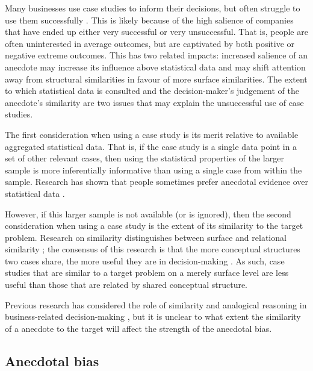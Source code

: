 \documentclass[a4paper, nobind, dvipsnames]{templates/ociamthesis}
\theoremstyle{definition}
\theoremstyle{definition}
\theoremstyle{definition}
\theoremstyle{definition}
\theoremstyle{remark}
\begin{document}
Many businesses use case studies to inform their decisions, but often struggle
to use them successfully \autocite{gavetti2005a}. This is likely because of the high
salience of companies that have ended up either very successful or very
unsuccessful. That is, people are often uninterested in average outcomes, but
are captivated by both positive or negative extreme outcomes. This has two
related impacts: increased salience of an anecdote may increase its influence
above statistical data and may shift attention away from structural similarities
in favour of more surface similarities. The extent to which statistical data is
consulted and the decision-maker's judgement of the anecdote's similarity are
two issues that may explain the unsuccessful use of case studies.

The first consideration when using a case study is its merit relative to
available aggregated statistical data. That is, if the case study is a single
data point in a set of other relevant cases, then using the statistical
properties of the larger sample is more inferentially informative than using a
single case from within the sample. Research has shown that people sometimes
prefer anecdotal evidence over statistical data \autocites[e.g.,][]{reinard1988,shen2015,jaramillo2019}.

However, if this larger sample is not available (or is ignored), then the second
consideration when using a case study is the extent of its similarity to the
target problem. Research on similarity distinguishes between surface and
relational similarity \autocite{gentner1983}; the consensus of this research is that the
more conceptual structures two cases share, the more useful they are in
decision-making \autocite{markman1995,lassaline1996}. As such, case studies that are
similar to a target problem on a merely surface level are less useful than those
that are related by shared conceptual structure.

Previous research has considered the role of similarity and analogical reasoning
in business-related decision-making \autocite{gavetti2005}, but it is unclear to what
extent the similarity of a anecdote to the target will affect the strength of
the anecdotal bias.

\subsection{Anecdotal bias}
\end{document}
